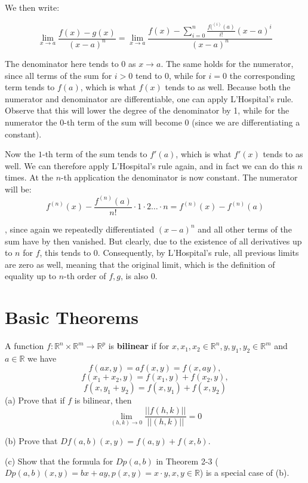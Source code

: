 \begin{solution}
    We then write:

    $$\lim_{x \rightarrow a} \frac{f(x) - g(x)}{(x - a)^n} = \lim_{x \rightarrow a} \frac{f(x) - \sum_{i = 0}^{n} \frac{f(^{(i)}(a)}{i!}(x - a)^i}{(x - a)^n}$$

    The denominator here tends to 0 as $x \rightarrow a$. The same holds for the numerator, since all terms of the sum for $i > 0$ tend to 0, while for $i = 0$ the corresponding term tends to $f(a)$, which is what $f(x)$ tends to as well. Because both the numerator and denominator are differentiable, one can apply L'Hospital's rule. Observe that this will lower the degree of the denominator by 1, while for the numerator the $0$-th term of the sum will become 0 (since we are differentiating a constant).

    Now the $1$-th term of the sum tends to $f'(a)$, which is what $f'(x)$ tends to as well. We can therefore apply L'Hospital's rule again, and in fact we can do this $n$ times. At the $n$-th application the denominator is now constant. The numerator will be:
    $$f^{(n)}(x) - \frac{f^{(n)}(a)}{n!} \cdot 1 \cdot 2 \ldots \cdot n = f^{(n)}(x) - f^{(n)}(a)$$

    , since again we repeatedly differentiated $(x-a)^n$ and all other terms of the sum have by then vanished. But clearly, due to the existence of all derivatives up to $n$ for $f$, this tends to 0. Consequently, by L'Hospital's rule, all previous limits are zero as well, meaning that the original limit, which is the definition of equality up to $n$-th order of $f, g$, is also 0.
\end{solution}

\newpage

\section{Basic Theorems}

\begin{exercise}{12}
    A function $f: \mathbb{R}^n \times \mathbb{R}^m \rightarrow \mathbb{R}^p$ is \textbf{bilinear} if for $x, x_1, x_2 \in \mathbb{R}^n, y, y_1, y_2 \in \mathbb{R}^m$ and $a \in \mathbb{R}$ we have
    $$f(ax, y) = af(x, y) = f(x, ay),$$
    $$f(x_1 + x_2, y) = f(x_1, y) + f(x_2, y),$$
    $$f(x, y_1 + y_2) = f(x, y_1) + f(x, y_2)$$
    (a) Prove that if $f$ is bilinear, then
    $$\lim_{(h, k) \rightarrow 0} \frac{\lvert \lvert f(h, k) \rvert \rvert}{\lvert \lvert (h, k) \rvert \rvert} = 0$$

    (b) Prove that $D f(a, b)(x, y) = f(a, y) + f(x, b)$.

    (c) Show that the formula for $Dp(a, b)$ in Theorem 2-3 ($D p(a, b)(x, y) = bx + ay, p(x, y) = x \cdot y, x, y \in \mathbb{R}$) is a special case of (b).
\end{exercise}


